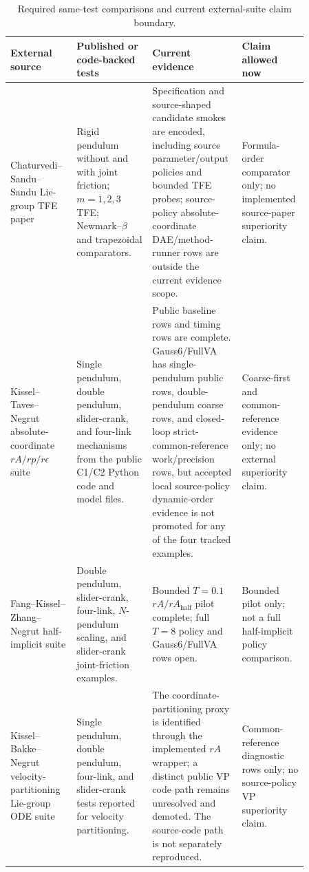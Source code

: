 \documentclass[preprint,12pt]{elsarticle}
\newcommand{\method}{Gauss6\slash FullVA}
\newcommand{\tfe}{TFE}
\begin{document}
\begin{table}[htbp]
\centering
\caption{Required same-test comparisons and current external-suite claim boundary.}
\label{tab:cross-paper-boundary}
\scriptsize
\renewcommand{\arraystretch}{0.88}
\setlength{\tabcolsep}{3pt}
\begin{tabular}{P{0.21\linewidth}P{0.24\linewidth}P{0.22\linewidth}P{0.19\linewidth}}
\toprule
External source & Published or code-backed tests & Current evidence & Claim allowed now \\
\midrule
Chaturvedi--Sandu--Sandu Lie-group \tfe{} paper
\cite{chaturvedi2026tfe} &
Rigid pendulum without and with joint friction; $m=1,2,3$ \tfe{};
Newmark--$\beta$ and trapezoidal comparators. &
Specification and source-shaped candidate smokes are encoded, including source
parameter/output policies and bounded \tfe{} probes; source-policy
absolute-coordinate DAE/method-runner rows are outside the current evidence
scope. &
Formula-order comparator only; no implemented source-paper superiority claim. \\
Kissel--Taves--Negrut absolute-coordinate $rA/rp/r\epsilon$ suite
\cite{taves2020exponential,kissel2021dwelling,kissel2022absolute} &
Single pendulum, double pendulum, slider-crank, and four-link mechanisms from
the public C1/C2 Python code and model files. &
Public baseline rows and timing rows are complete. \method{} has
single-pendulum public rows, double-pendulum coarse rows, and closed-loop
strict-common-reference work/precision rows, but accepted local
source-policy dynamic-order evidence is not promoted for any of the four
tracked examples. &
Coarse-first and common-reference evidence only; no external superiority
claim. \\
Fang--Kissel--Zhang--Negrut half-implicit suite
\cite{fang2023halfimplicit} &
Double pendulum, slider-crank, four-link, $N$-pendulum scaling, and
slider-crank joint-friction examples. &
Bounded $T=0.1$ $rA/rA_{\mathrm{half}}$ pilot complete; full $T=8$ policy and
\method{} rows open. &
Bounded pilot only; not a full half-implicit policy comparison. \\
Kissel--Bakke--Negrut velocity-partitioning Lie-group ODE suite
\cite{kissel2024velocitypartitioning} &
Single pendulum, double pendulum, four-link, and slider-crank tests reported
for velocity partitioning. &
The coordinate-partitioning proxy is identified through the implemented $rA$
wrapper; a distinct public VP code path remains unresolved and demoted. The
source-code path is not separately reproduced. &
Common-reference diagnostic rows only; no source-policy VP superiority claim. \\
\bottomrule
\end{tabular}
\end{table}
\end{document}
